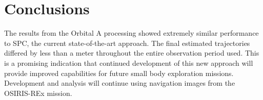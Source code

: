 \documentclass{RPI-SIW}
\begin{document}
\section*{Conclusions}
The results from the Orbital A processing showed extremely similar performance to SPC, the current state-of-the-art approach.  The final estimated trajectories differed by less than a meter throughout the entire observation period used.  This is a promising indication that continued development of this new approach will provide improved capabilities for future small body exploration missions.  Development and analysis will continue using navigation images from the OSIRIS-REx mission.

\vspace{3pt}

\titleformat{\section}[runin]{\normalsize\bfseries}{\thesection}{0em}{\addperiod}
{\footnotesize }
\end{document}
